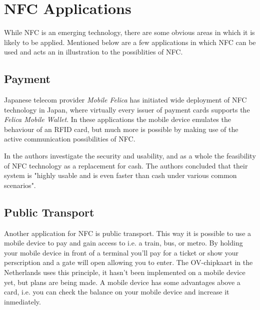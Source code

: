 \chapter{NFC Applications}
\label{chap:applications}

While NFC is an emerging technology, there are some obvious areas in which it is likely to be applied. Mentioned below are a few applications in which NFC can be used and acts an in illustration to the possiblities of NFC.

\section{Payment} 
Japanese telecom provider \textit{Mobile Felica} has initiated wide deployment of NFC technology in Japan, where virtually every issuer of payment cards supports the \textit{Felica Mobile Wallet}.
In these applications the mobile device emulates the behaviour of an RFID card, but much more is possible by making use of the active communication possibilities of NFC. %

In \cite{1555846} the authors investigate the security and usability, and as a whole the feasibility of NFC technology as a replacement for cash.
The authors concluded that their system is "highly usable and is even faster than cash under various common scenarios".


\section{Public Transport}
Another application for NFC is public transport. This way it is possible to use a mobile device to pay and gain access to i.e. a train, bus, or metro. By holding your mobile device in front of a terminal you'll pay for a ticket or show your perscription and a gate will open allowing you to enter. The OV-chipkaart in the Netherlands uses this principle, it hasn't been implemented on a mobile device yet, but plans are being made. A mobile device has some advantages above a card, i.e. you can check the balance on your mobile device and increase it inmediately. %

